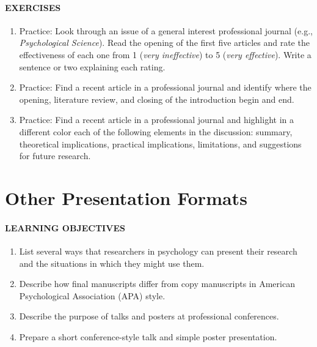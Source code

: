\documentclass[
]{krantz}
\providecommand{\tightlist}{%
  \setlength{\itemsep}{0pt}\setlength{\parskip}{0pt}}
\begin{document}
\paragraph*{EXERCISES}\label{exercises-25}

\begin{enumerate}
\def\labelenumi{\arabic{enumi}.}
\tightlist
\item
  Practice: Look through an issue of a general interest professional journal (e.g., \emph{Psychological Science}). Read the opening of the first five articles and rate the effectiveness of each one from 1 (\emph{very ineffective}) to 5 (\emph{very effective}). Write a sentence or two explaining each rating.
\item
  Practice: Find a recent article in a professional journal and identify where the opening, literature review, and closing of the introduction begin and end.
\item
  Practice: Find a recent article in a professional journal and highlight in a different color each of the following elements in the discussion: summary, theoretical implications, practical implications, limitations, and suggestions for future research.
\end{enumerate}

\section{Other Presentation Formats}\label{other-presentation-formats}

\paragraph*{LEARNING OBJECTIVES}\label{learning-objectives-32}

\begin{enumerate}
\def\labelenumi{\arabic{enumi}.}
\tightlist
\item
  List several ways that researchers in psychology can present their research and the situations in which they might use them.
\item
  Describe how final manuscripts differ from copy manuscripts in American Psychological Association (APA) style.
\item
  Describe the purpose of talks and posters at professional conferences.
\item
  Prepare a short conference-style talk and simple poster presentation.
\end{enumerate}
\end{document}
